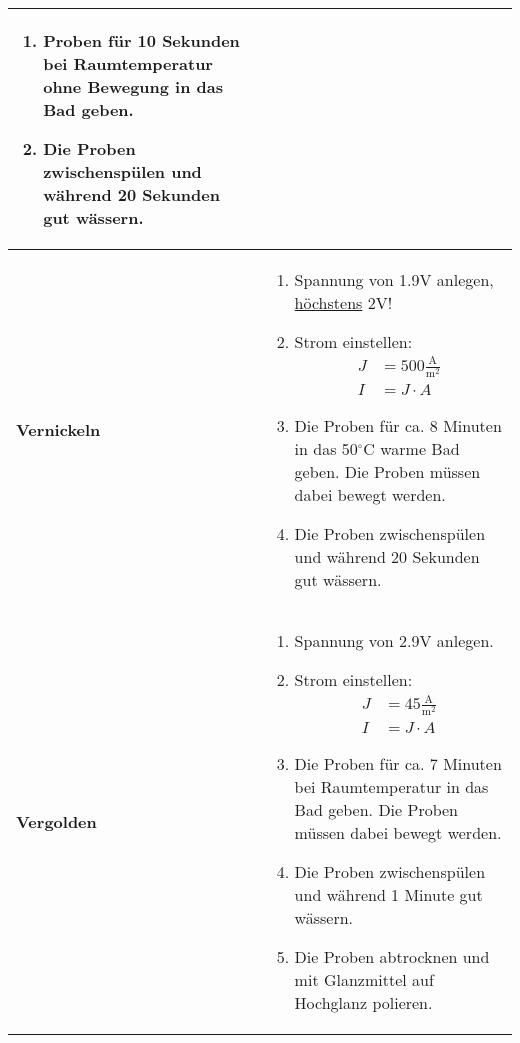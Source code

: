 \begin{longtable}{p{3cm}p{14cm}}
\begin{enumerate}
			\item Proben für 10 Sekunden bei Raumtemperatur ohne Bewegung in das Bad geben.
			
			\item Die Proben zwischenspülen und während 20 Sekunden gut wässern.
		\end{enumerate}\\
	\hline
	\textbf{Vernickeln}
		&
		\begin{enumerate}
			\item Spannung von 1.9V anlegen, \underline{höchstens} 2V!
			
			\item Strom einstellen: 	$$\begin{aligned}
											J &= 500 \frac{\mathrm{A}}{\mathrm{m}^2}\\
											I &= J\cdot A
										\end{aligned}$$
										
			\item Die Proben für ca. 8 Minuten in das 50$^\circ$C warme Bad geben. Die Proben müssen dabei bewegt werden.
			
			\item Die Proben zwischenspülen und während 20 Sekunden gut wässern.
		\end{enumerate}\\
	\newpage
	\textbf{Vergolden}
		&
		\begin{enumerate}
			\item Spannung von 2.9V anlegen.
			
			\item Strom einstellen: 	$$\begin{aligned}
											J &= 45 \frac{\mathrm{A}}{\mathrm{m}^2}\\
											I &= J\cdot A
										\end{aligned}$$
										
			\item Die Proben für ca. 7 Minuten bei Raumtemperatur in das Bad geben. Die Proben müssen dabei bewegt werden.
			
			\item Die Proben zwischenspülen und während 1 Minute gut wässern.
			
			\item Die Proben abtrocknen und mit Glanzmittel auf Hochglanz polieren.
			

\end{enumerate}
\end{longtable}
